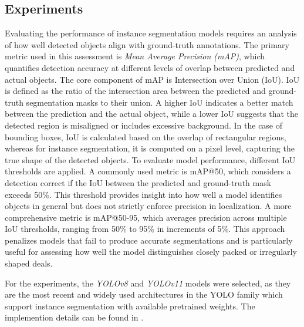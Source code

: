 \documentclass[11pt]{article}
\begin{document}
\subsection{Experiments}
Evaluating the performance of instance segmentation models requires an analysis of how well detected objects align with ground-truth annotations. The primary metric used in this assessment is \emph{Mean Average Precision (mAP)}, which quantifies detection accuracy at different levels of overlap between predicted and actual objects. The core component of mAP is Intersection over Union (IoU). IoU is defined as the ratio of the intersection area between the predicted and ground-truth segmentation masks to their union. A higher IoU indicates a better match between the prediction and the actual object, while a lower IoU suggests that the detected region is misaligned or includes excessive background. In the case of bounding boxes, IoU is calculated based on the overlap of rectangular regions, whereas for instance segmentation, it is computed on a pixel level, capturing the true shape of the detected objects. To evaluate model performance, different IoU thresholds are applied. A commonly used metric is mAP@50, which considers a detection correct if the IoU between the predicted and ground-truth mask exceeds 50\%. This threshold provides insight into how well a model identifies objects in general but does not strictly enforce precision in localization. A more comprehensive metric is mAP@50-95, which averages precision across multiple IoU thresholds, ranging from 50\% to 95\% in increments of 5\%. This approach penalizes models that fail to produce accurate segmentations and is particularly useful for assessing how well the model distinguishes closely packed or irregularly shaped deals.

For the experiments, the \emph{YOLOv8} and \emph{YOLOv11} models were selected, as they are the most recent and widely used architectures in the YOLO family which support instance segmentation with available pretrained weights. The implemention details can be found in .
\end{document}
